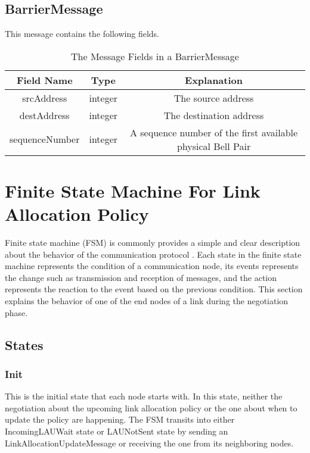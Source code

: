 \subsection{BarrierMessage}

This message contains the following fields.

\begin{table}[ht]
  \begin{center}
    \begin{tabular}{|c|c|c|} \hline
      Field Name & Type & Explanation \\ \hline \cline{1-3}
      srcAddress & integer & The source address \\ \cline{1-3}
      destAddress & integer & The destination address \\ \cline{1-3}
      sequenceNumber & integer & A sequence number of the first available physical Bell Pair \\ \cline{1-3}
    \end{tabular}
    \caption{The Message Fields in a BarrierMessage}
  \end{center}
\end{table}

\newpage

\section{Finite State Machine For Link Allocation Policy}

Finite state machine (FSM) is commonly provides a simple and clear description about the behavior of the communication protocol \cite{BOCHMANN1978361}.
Each state in the finite state machine represents the condition of a communication node, its events represents the change such as transmission and reception of messages, and the action represents the reaction to the event based on the previous condition.
This section explains the behavior of one of the end nodes of a link during the negotiation phase. 

\subsection{States}

\subsubsection{Init}
This is the initial state that each node starts with.  
In this state, neither the negotiation about the upcoming link allocation policy or the one about when to update the policy are happening.
The FSM transits into either IncomingLAUWait state or LAUNotSent state by sending an LinkAllocationUpdateMessage or receiving the one from its neighboring nodes.

